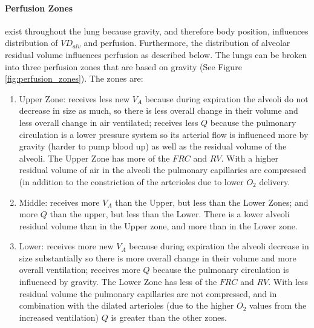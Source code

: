 \paragraph{Perfusion Zones} exist throughout the lung because gravity, and therefore body position, influences distribution of $VD_{alv}$ and perfusion. Furthermore, the distribution of alveolar residual volume influences perfusion as described below. The lungs can be broken into three perfusion zones that are based on gravity (See Figure \ref{fig:perfusion_zones}).
\vspace{2mm}
The zones are:
\begin{enumerate}
    \item Upper Zone: receives less new $V_A$ because during expiration the alveoli do not decrease in size as much, so there is less overall change in their volume and less overall change in air ventilated; receives less $Q$ because the pulmonary circulation is a lower pressure system so its arterial flow is influenced more by gravity (harder to pump blood up) as well as the residual volume of the alveoli. The Upper Zone has more of the $FRC$ and $RV$. With a higher residual volume of air in the alveoli the pulmonary capillaries are compressed (in addition to the constriction of the arterioles due to lower $O_2$ delivery.
    \item Middle: receives more $V_A$ than the Upper, but less than the Lower Zones; and more $Q$ than the upper, but less than the Lower. There is a lower alveoli residual volume than in the Upper zone, and more than in the Lower zone.
    \item Lower: receives more new $V_A$ because during expiration the alveoli decrease in size substantially so there is more overall change in their volume and more overall ventilation; receives more $Q$ because the pulmonary circulation is influenced by gravity. The Lower Zone has less of the $FRC$ and $RV$. With less residual volume the pulmonary capillaries are not compressed, and in combination with the dilated arterioles (due to the higher $O_2$ values from the increased ventilation) $Q$ is greater than the other zones.
\end{enumerate}
\vspace{3mm}

